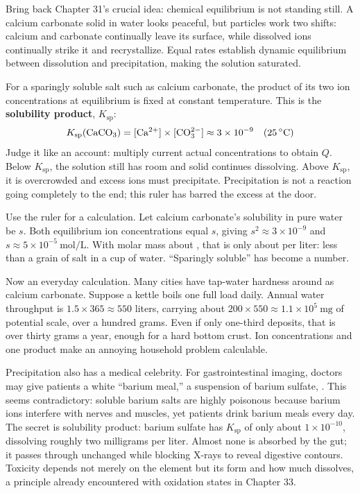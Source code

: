 Bring back Chapter 31's crucial idea: chemical equilibrium is not standing still. A calcium carbonate solid in water looks peaceful, but particles work two shifts: calcium and carbonate continually leave its surface, while dissolved ions continually strike it and recrystallize. Equal rates establish dynamic equilibrium between dissolution and precipitation, making the solution saturated.

\begin{qiaoliang}
For a sparingly soluble salt such as calcium carbonate, the product of its two ion concentrations at equilibrium is fixed at constant temperature. This is the \textbf{solubility product}, $K_{\mathrm{sp}}$:
\[K_{\mathrm{sp}}(\mathrm{CaCO_3}) = [\mathrm{Ca^{2+}}]\times[\mathrm{CO_3^{2-}}] \approx 3\times10^{-9}\quad(25\,^{\circ}\mathrm{C})\]
Judge it like an account: multiply current actual concentrations to obtain $Q$. Below $K_{\mathrm{sp}}$, the solution still has room and solid continues dissolving. Above $K_{\mathrm{sp}}$, it is overcrowded and excess ions must precipitate. Precipitation is not a reaction going completely to the end; this ruler has barred the excess at the door.
\end{qiaoliang}

Use the ruler for a calculation. Let calcium carbonate's solubility in pure water be $s$. Both equilibrium ion concentrations equal $s$, giving $s^2\approx3\times10^{-9}$ and $s\approx5\times10^{-5}\ \mathrm{mol/L}$. With molar mass about , that is only about  per liter: less than a grain of salt in a cup of water. ``Sparingly soluble'' has become a number.

Now an everyday calculation. Many cities have tap-water hardness around  as calcium carbonate. Suppose a  kettle boils one full load daily. Annual water throughput is $1.5\times365\approx550$ liters, carrying about $200\times550\approx1.1\times10^{5}\ \mathrm{mg}$ of potential scale, over a hundred grams. Even if only one-third deposits, that is over thirty grams a year, enough for a hard bottom crust. Ion concentrations and one product make an annoying household problem calculable.

Precipitation also has a medical celebrity. For gastrointestinal imaging, doctors may give patients a white ``barium meal,'' a suspension of barium sulfate, . This seems contradictory: soluble barium salts are highly poisonous because barium ions interfere with nerves and muscles, yet patients drink barium meals every day. The secret is solubility product: barium sulfate has $K_{\mathrm{sp}}$ of only about $1\times10^{-10}$, dissolving roughly two milligrams per liter. Almost none is absorbed by the gut; it passes through unchanged while blocking X-rays to reveal digestive contours. Toxicity depends not merely on the element but its form and how much dissolves, a principle already encountered with oxidation states in Chapter 33.

